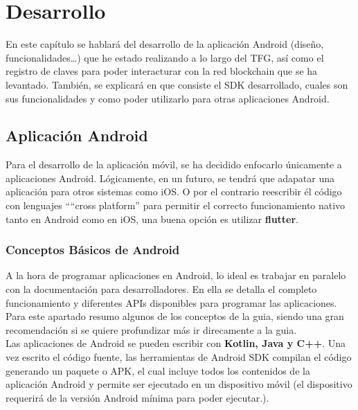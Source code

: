 \chapter{Desarrollo}
\label{cap:Desarrollo}

\setlength{\parindent}{0pt}

En este capítulo se hablará del desarrollo de la aplicación Android (diseño, funcionalidades\dots) que he estado realizando a lo largo del TFG, así como el registro de claves para poder interacturar con la red blockchain que se ha levantado. También, se explicará en que consiste el SDK desarrollado, cuales son sus funcionalidades y como poder utilizarlo para otras aplicaciones Android.

\section{Aplicación Android}

Para el desarrollo de la aplicación móvil, se ha decidido enfocarlo únicamente a aplicaciones Android. Lógicamente, en un futuro, se tendrá que adapatar una aplicación para otros sistemas como iOS. O por el contrario reescribir él código con lenguajes ````cross platform'' para permitir el correcto funcionamiento nativo tanto en Android como en iOS, una buena opción es utilizar \textbf{flutter}\cite{flutter}.

\subsection{Conceptos Básicos de Android}

A la hora de programar aplicaciones en Android, lo ideal es trabajar en paralelo con la documentación para desarrolladores\cite{androidDocs}. En ella se detalla el completo funcionamiento y diferentes APIs disponibles para programar las aplicaciones. Para este apartado resumo algunos de los conceptos de la guia, siendo una gran recomendación si se quiere profundizar más ir direcamente a la guia. \\

Las aplicaciones de Android se pueden escribir con \textbf{Kotlin, Java y C++}\cite{kotlin,java,c++}. Una vez escrito el código fuente, las herramientas de Android SDK compilan el código generando un paquete o APK, el cual incluye todos los contenidos de la aplicación Android y permite ser ejecutado en un dispositivo móvil (el dispositivo requerirá de la versión Android mínima para poder ejecutar.). \\

